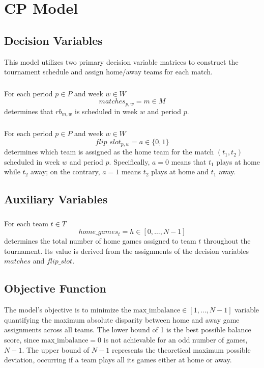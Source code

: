 \section{CP Model}
\subsection{Decision Variables}
This model utilizes two primary decision variable matrices to construct the tournament schedule and assign home/away teams for each match.

\subsubsection{}
For each period $p \in P$ and week $w \in W$
$$
matches_{p,w}=m \in M
$$
determines that $rb_{m, w}$ is scheduled in week $w$ and period $p$.


\subsubsection{}  
For each period $p \in P$ and week $w \in W$  
$$  
flip\_slot_{p,w} = a \in \{0, 1\}  
$$  
determines which team is assigned as the home team for the match $(t_1, t_2)$ scheduled in week $w$ and period $p$. Specifically, $a = 0$ means that $t_1$ plays at home while $t_2$ away; on the contrary, $a = 1$ means $t_2$ plays at home and $t_1$ away.


\subsection{Auxiliary Variables}
\subsubsection{}  
For each team $t \in T$  
$$  
home\_games_{t} = h \in [0, \dots, N-1]  
$$  
determines the total number of home games assigned to team $t$ throughout the tournament. Its value is derived from the assignments of the decision variables $matches$ and $flip\_slot$.


\subsection{Objective Function}

The model's objective is to minimize  the $\text{max\_imbalance} \in [1, \dots, N-1]$ variable quantifying the maximum absolute disparity between home and away game assignments across all teams. 
The lower bound of 1 is the best possible balance score, since $\text{max\_imbalance}=0$ is not achievable for an odd number of games, $N-1$.
The upper bound of $N-1$ represents the theoretical maximum possible deviation, occurring if a team plays all its games either at home or away.

